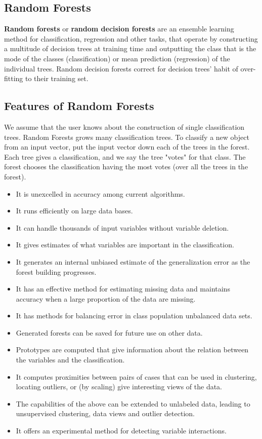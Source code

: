 \documentclass[document.tex]{subfiles}
\begin{document}
\begin{appendices}
        
        \chapter{Random Forests}
        \textbf{Random forests} or \textbf{random decision forests} are an ensemble learning method for classification, regression and other tasks, that operate by constructing a multitude of decision trees at training time and outputting the class that is the mode of the classes (classification) or mean prediction (regression) of the individual trees. Random decision forests correct for decision trees' habit of over-fitting to their training set.
        \section{Features of Random Forests}
        We assume that the user knows about the construction of single classification trees. Random Forests grows many classification trees. To classify a new object from an input vector, put the input vector down each of the trees in the forest. Each tree gives a classification, and we say the tree "votes" for that class. The forest chooses the classification having the most votes (over all the trees in the forest).
        \begin{itemize}
        	\item It is unexcelled in accuracy among current algorithms.
        	\item It runs efficiently on large data bases.
        	\item It can handle thousands of input variables without variable deletion.
        	\item It gives estimates of what variables are important in the classification.
        	\item It generates an internal unbiased estimate of the generalization error as the forest building progresses.
        	\item It has an effective method for estimating missing data and maintains accuracy when a large proportion of the data are missing.
        	\item It has methods for balancing error in class population unbalanced data sets.
        	\item Generated forests can be saved for future use on other data.
        	\item Prototypes are computed that give information about the relation between the variables and the classification.
        	\item It computes proximities between pairs of cases that can be used in clustering, locating outliers, or (by scaling) give interesting views of the data.
        	\item The capabilities of the above can be extended to unlabeled data, leading to unsupervised clustering, data views and outlier detection.
        	\item It offers an experimental method for detecting variable interactions.
        \end{itemize}

\end{appendices}
\end{document}
